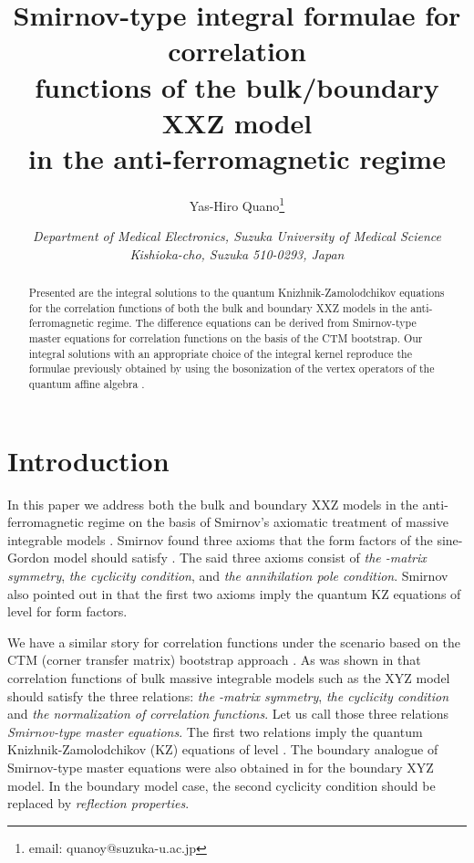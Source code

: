 \documentclass[a4paper,10pt]{article}
\title{Smirnov-type integral formulae for 
correlation \\ functions of 
the bulk/boundary XXZ model \\ in the 
anti-ferromagnetic regime}
\author{Yas-Hiro Quano\thanks
{email: quanoy@suzuka-u.ac.jp}}
\date{\it Department of Medical Electronics, 
Suzuka University of Medical Science \\
      \it Kishioka-cho, Suzuka 510-0293, Japan}
\begin{document}
\maketitle
\begin{abstract}
Presented are the integral solutions to the quantum 
Knizhnik-Zamolodchikov equations for the 
correlation functions of both the bulk and boundary XXZ 
models in the anti-ferromagnetic regime. 
The difference equations can be derived from 
Smirnov-type master equations for correlation functions 
on the basis of the CTM bootstrap. Our integral solutions 
with an appropriate choice of the integral kernel reproduce 
the formulae previously obtained by using the bosonization 
of the vertex operators of the quantum affine algebra 
\coordHE{}. 
\end{abstract}

\section{Introduction}

In this paper we address both the bulk and boundary XXZ 
models in the anti-ferromagnetic regime on the basis of 
Smirnov's axiomatic treatment of massive integrable 
models \cite{Smbk}. Smirnov found three axioms that 
the form factors of the sine-Gordon model should 
satisfy \cite{Smbk}. The said three axioms consist 
of {\it the \coordHE{}-matrix symmetry}, 
{\it the cyclicity condition}, and 
{\it the annihilation pole condition}. 
Smirnov also pointed out in \cite{Sm1} 
that the first two axioms imply the quantum 
KZ equations \cite{FR} of level \coordHE{} for form factors. 

We have a similar story for correlation functions 
under the scenario based on the CTM (corner transfer 
matrix) bootstrap approach \cite{ESM}. 
As was shown in \cite{JMN} that correlation 
functions of bulk massive integrable models such as 
the XYZ model should satisfy the three relations: 
{\it the \coordHE{}-matrix symmetry}, 
{\it the cyclicity condition} and 
{\it the normalization of correlation functions}. 
Let us call those three relations 
{\it Smirnov-type master equations}. 
The first two relations imply the quantum 
Knizhnik-Zamolodchikov (KZ) equations \cite{FR} of 
level \coordHE{}. The boundary analogue of Smirnov-type 
master equations were also obtained in \cite{JKKMW} 
for the boundary XYZ model. 
In the boundary model case, the second cyclicity condition 
should be replaced by {\it reflection properties}. 
\end{document}
